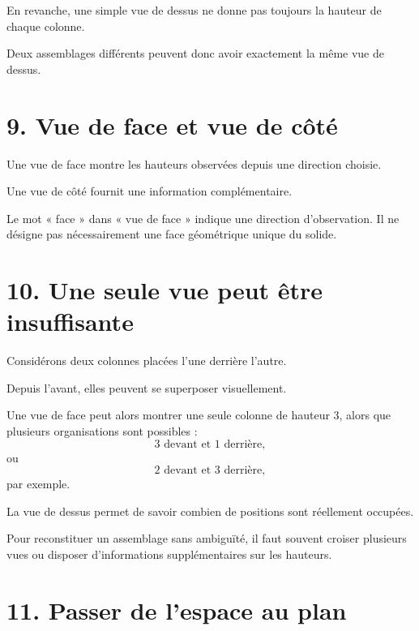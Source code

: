 En revanche, une simple vue de dessus ne donne pas toujours la hauteur de chaque colonne.

Deux assemblages différents peuvent donc avoir exactement la même vue de dessus.

\section{9. Vue de face et vue de côté}

Une vue de face montre les hauteurs observées depuis une direction choisie.

Une vue de côté fournit une information complémentaire.


\begin{remarque}
Le mot « face » dans « vue de face » indique une direction d'observation. Il ne désigne pas nécessairement une face géométrique unique du solide.
\end{remarque}

\section{10. Une seule vue peut être insuffisante}

Considérons deux colonnes placées l'une derrière l'autre.

Depuis l'avant, elles peuvent se superposer visuellement.

Une vue de face peut alors montrer une seule colonne de hauteur $3$, alors que plusieurs organisations sont possibles :
\[
3\text{ devant et }1\text{ derrière},
\]
ou
\[
2\text{ devant et }3\text{ derrière},
\]
par exemple.

La vue de dessus permet de savoir combien de positions sont réellement occupées.

\begin{propriete}
Pour reconstituer un assemblage sans ambiguïté, il faut souvent croiser plusieurs vues ou disposer d'informations supplémentaires sur les hauteurs.
\end{propriete}

\section{11. Passer de l'espace au plan}

